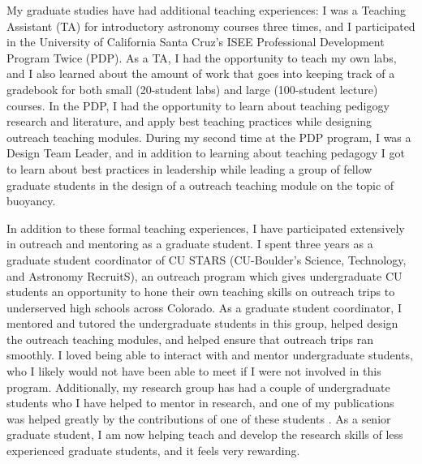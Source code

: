 \documentclass[aps, pre, onecolumn, nofootinbib, notitlepage, groupedaddress, amsfonts, amssymb, amsmath]{revtex4-1}
\begin{document}
My graduate studies have had additional teaching experiences: I was a Teaching Assistant (TA) for introductory astronomy courses three times, and I participated in the University of California Santa Cruz's ISEE Professional Development Program Twice (PDP).
As a TA, I had the opportunity to teach my own labs, and I also learned about the amount of work that goes into keeping track of a gradebook for both small (20-student labs) and large (100-student lecture) courses.
In the PDP, I had the opportunity to learn about teaching pedigogy research and literature, and apply best teaching practices while designing outreach teaching modules.
During my second time at the PDP program, I was a Design Team Leader, and in addition to learning about teaching pedagogy I got to learn about best practices in leadership while leading a group of fellow graduate students in the design of a outreach teaching module on the topic of buoyancy.

In addition to these formal teaching experiences, I have participated extensively in outreach and mentoring as a graduate student.
I spent three years as a graduate student coordinator of CU STARS (CU-Boulder's Science, Technology, and Astronomy RecruitS), an outreach program which gives undergraduate CU students an opportunity to hone their own teaching skills on outreach trips to underserved high schools across Colorado.
As a graduate student coordinator, I mentored and tutored the undergraduate students in this group, helped design the outreach teaching modules, and helped ensure that outreach trips ran smoothly.
I loved being able to interact with and mentor undergraduate students, who I likely would not have been able to meet if I were not involved in this program.
Additionally, my research group has had a couple of undergraduate students who I have helped to mentor in research, and one of my publications was helped greatly by the contributions of one of these students \citep{anders&all2019}.
As a senior graduate student, I am now helping teach and develop the research skills of less experienced graduate students, and it feels very rewarding.
\end{document}
